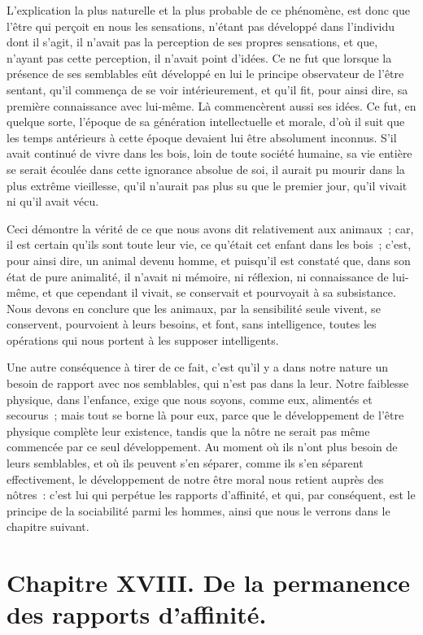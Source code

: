 \documentclass[french,twoside]{book} %
\newcommand\chapteropen{} %
\newcommand\chapterclose{} %
\begin{document}
L’explication la plus naturelle et la plus probable de ce phénomène, est donc que l’être qui perçoit en nous les sensations, n’étant pas développé dans l’individu dont il s’agit, il n’avait pas la perception de ses propres sensations, et que, n’ayant pas cette perception, il n’avait point d’idées. Ce ne fut que lorsque la présence de ses semblables eût développé en lui le principe observateur de l’être sentant, qu’il commença de se voir intérieurement, et qu’il fit, pour ainsi dire, sa première connaissance avec lui-même. Là commencèrent aussi ses idées. Ce fut, en quelque sorte, l’époque de sa génération intellectuelle et morale, d’où il suit que les temps antérieurs à cette époque devaient lui être absolument inconnus. S’il avait continué de vivre dans les bois, loin de toute société humaine, sa vie entière se serait écoulée dans cette ignorance absolue de soi, il aurait pu mourir dans la plus extrême vieillesse, qu’il n’aurait pas plus su que le premier jour, qu’il vivait ni qu’il avait vécu.\par
Ceci démontre la vérité de ce que nous avons dit relativement aux animaux ; car, il est certain qu’ils sont toute leur vie, ce qu’était cet enfant dans les bois ; c’est, pour ainsi dire, un animal devenu homme, et puisqu’il est constaté que, dans son état de pure animalité, il n’avait ni mémoire, ni réflexion, ni connaissance de lui-même, et que cependant il vivait, se conservait et pourvoyait à sa subsistance. Nous devons en conclure que les animaux, par la sensibilité seule vivent, se conservent, pourvoient à leurs besoins, et font, sans intelligence, toutes les opérations qui nous portent à les supposer intelligents.\par
Une autre conséquence à tirer de ce fait, c’est qu’il y a dans notre nature un besoin de rapport avec nos semblables, qui n’est pas dans la leur. Notre faiblesse physique, dans l’enfance, exige que nous soyons, comme eux, alimentés et secourus ; mais tout se borne là pour eux, parce que le développement de l’être physique complète leur existence, tandis que la nôtre ne serait pas même commencée par ce seul développement. Au moment où ils n’ont plus besoin de leurs semblables, et où ils peuvent s’en séparer, comme ils s’en séparent effectivement, le développement de notre être moral nous retient auprès des nôtres : c’est lui qui perpétue les rapports d’affinité, et qui, par conséquent, est le principe de la sociabilité parmi les hommes, ainsi que nous le verrons dans le chapitre suivant.
\chapterclose


\chapteropen
\chapter[{Chapitre XVIII. De la permanence des rapports d’affinité.}]{Chapitre XVIII. De la permanence des rapports d’affinité.}\renewcommand{\leftmark}{Chapitre XVIII. De la permanence des rapports d’affinité.}
\end{document}
